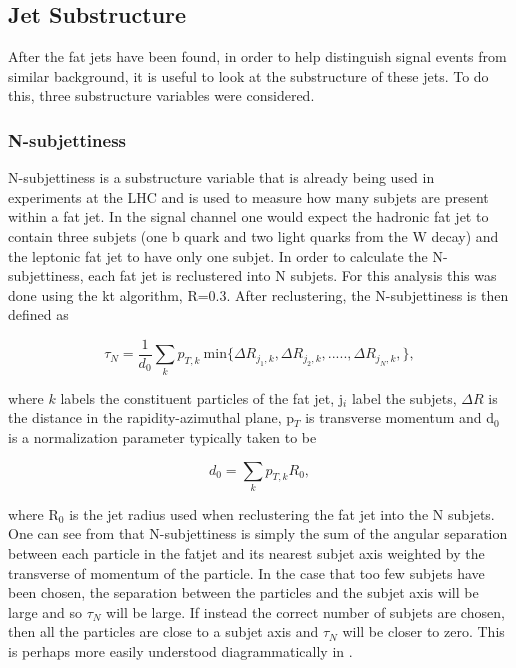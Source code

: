 \subsection{Jet Substructure}
After the fat jets have been found, in order to help distinguish signal events from similar background, it is useful to look at the substructure of these jets. To do this, three substructure variables were considered.

\subsubsection{N-subjettiness}
N-subjettiness is a substructure variable that is already being used in experiments at the LHC and is used to measure how many subjets are present within a fat jet. In the signal channel one would expect the hadronic fat jet to contain three subjets (one b quark and two light quarks from the W decay) and the leptonic fat jet to have only one subjet. In order to calculate the N-subjettiness, each fat jet is reclustered into N subjets. For this analysis this was done using the kt algorithm, R=0.3. After reclustering, the N-subjettiness is then defined as\cite{Thaler:2010tr}

\begin{equation}
  \label{eq:nsubjet}
  \tau_N=\frac{1}{d_0}\sum\limits_{k}p_{T,k}~\text{min}\{\Delta R_{j_1,k},\Delta R_{j_2,k},.....,\Delta R_{j_N,k},\},
\end{equation}

where $k$ labels the constituent particles of the fat jet, j$_{i}$ label the subjets, $\Delta R$ is the distance in the rapidity-azimuthal plane, p$_{T}$ is transverse momentum and d$_0$ is a normalization parameter typically taken to be

\begin{equation}
  d_0=\sum\limits_{k}p_{T,k}R_0,
\end{equation}

where R$_0$ is the jet radius used when reclustering the fat jet into the N subjets. One can see from  that N-subjettiness is simply the sum of the angular separation between each particle in the fatjet and its nearest subjet axis weighted by the transverse of momentum of the particle. In the case that too few subjets have been chosen, the separation between the particles and the subjet axis will be large and so $\tau_N$ will be large. If instead the correct number of subjets are chosen, then all the particles are close to a subjet axis and $\tau_N$ will be closer to zero. This is perhaps more easily understood diagrammatically in .

